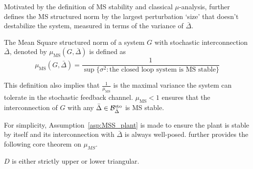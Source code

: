 Motivated by the definition of MS stability and classical \(\mu\)-analysis, \cite{Elia2005stabfading} further defines the MS structured norm by the largest perturbation `size' that doesn't destabilize the system, measured in terms of the variance of \(\bar{\Delta}\). 
\begin{defn}\label{defn:muMS}
The Mean Square structured norm of a system $G$ with stochastic interconnection $\bar{\Delta}$, denoted by $\mu_{\mathrm{MS}}(G,\bar{\Delta})$ is defined as
\begin{equation*}
    \mu_{\mathrm{MS}}(G,\bar{\Delta})=\frac{1}{\sup\{\sigma^2:\text{the closed loop system is MS stable}\}}
\end{equation*}
\end{defn}
This definition also implies that $\frac{1}{\mu_{\mathrm{MS}}}$ is the maximal variance the system can tolerate in the stochastic feedback channel. \(\mu_{\mathrm{MS}} < 1\) ensures that the interconnection of \(G\) with any \(\bar{\Delta} \in {\cal B}_{\bar{\Delta}}^{\mathrm{sto}}\) is MS stable.

For simplicity, Assumption~\ref{asp:MSS_plant} is made to ensure the plant is stable by itself and its interconnection with \(\bar{\Delta}\) is always well-posed. \cite{Elia2005stabfading} further provides the following core theorem on $\mu_{MS}$.
\begin{ass}\label{asp:MSS_plant}
\(D\) is either strictly upper or lower triangular.
\end{ass}


